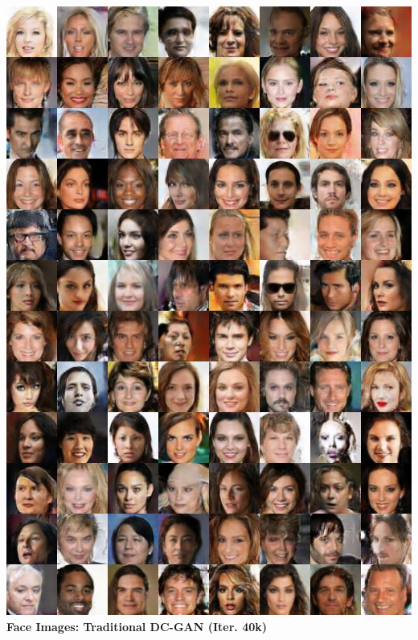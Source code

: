 \documentclass{article}
\begin{document}
\includegraphics[width=1.0\textwidth]{Figs/sup/fk12.jpg}\\
\clearpage
\textbf{Face Images: Traditional DC-GAN (Iter. 40k)}\\
\end{document}
